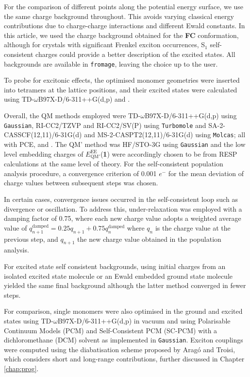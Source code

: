 For the comparison of different points along the potential energy surface, we use the same charge background throughout. This avoids varying classical energy contributions due to charge-charge interactions and different Ewald constants.\cite{Kantorovich2004} In this article, we used the charge background obtained for the \textbf{FC} conformation, although for crystals with significant Frenkel exciton occurrences, S$_1$ self-consistent charges could provide a better description of the excited states. All backgrounds are available in \texttt{fromage}, leaving the choice up to the user.

To probe for excitonic effects, the optimised monomer geometries were inserted into tetramers at the lattice positions, and their excited states were calculated using TD-$\omega$B97X-D/6-311++G(d,p) and \EEC{}.

Overall, the QM methods employed were TD-$\omega$B97X-D/6-311++G(d,p) using \texttt{Gaussian}, RI-CC2/TZVP and RI-CC2/SV(P) using \texttt{Turbomole} and SA-2-CASSCF(12,11)/6-31G(d) and MS-2-CASPT2(12,11)/6-31G(d) using \texttt{Molcas}; all with PCE, \EEC{} and \SCEEC{}. The QM' method was HF/STO-3G using \texttt{Gaussian} and the low level embedding charges of $E^{\text{EE}}_{\text{QM}'}$(\textbf{1}) were accordingly chosen to be from RESP calculations at the same level of theory. For the self-consistent population analysis procedure, a convergence criterion of 0.001 $e^-$ for the mean deviation of charge values between subsequent steps was chosen.

In certain cases, convergence issues occurred in the self-consistent loop such as divergence or oscillation. To address this, under-relaxation was employed with a damping factor of 0.75, where each new charge value adopts a weighted average value of $q_{n+1}^{\text{damped}} = 0.25 q_{n+1} + 0.75 q_n^{\text{damped}}$ where $q_n$ is the charge value at the previous step, and $q_{n+1}$ the new charge value obtained in the population analysis.

For excited state self consistent backgrounds, using initial charges from an isolated excited state molecule or an Ewald embedded ground state molecule yielded the same final background although the latter method converged in fewer steps.

For comparison, single monomers were also optimised in the ground and excited states using TD-$\omega$B97X-D/6-311++G(d,p) in vacuum and using Polarisable Continuum Models (PCM) and Self-Consistent PCM (SC-PCM) with a dichloromethane (DCM) solvent  as implemented in \texttt{Gaussian}. Exciton couplings were computed using the diabatisation scheme proposed by Aragó and Troisi, which considers short and long-range contributions, further discussed in Chapter \ref{chap:prog}.\cite{Arag2015}


